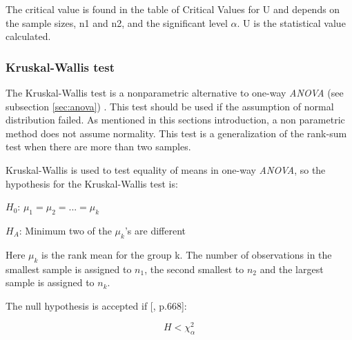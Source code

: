 The critical value is found in the table of Critical Values for U and depends on the sample sizes, n1 and n2, and the significant level $\alpha$. U is the statistical value calculated. 

\subsubsection[Kruskal]{Kruskal-Wallis test}\label{sec:kruskal-w-test}
The Kruskal-Wallis test is a nonparametric alternative to one-way \textit{ANOVA} (see subsection \ref{sec:anova})  \citep{Walpole2012}. This test should be used if the assumption of normal distribution failed. As mentioned in this sections introduction, a non parametric method does not assume normality. This test is a generalization of the rank-sum test when there are more than two samples.

Kruskal-Wallis is used to test equality of means in one-way \textit{ANOVA}, so the hypothesis for the Kruskal-Wallis test is:\newline

\centerline{$H_{0}$:  $\mu_{1} =  \mu_{2} = ... = \mu_{k} $} 
\centerline{$H_{A}$: Minimum two of the $\mu_{k}$'s are different}

Here $\mu_{k}$ is the rank mean for the group k. The number of observations in the smallest sample is assigned to $n_1$, the second smallest to $n_2$ and the largest sample is assigned to $n_k$. 

The null hypothesis is accepted if [\citep{Walpole2012}, p.668]: 

\begin{equation}
\label{eq:kruskapw-accept}
H < \chi^{2}_{\alpha}
\end{equation}

